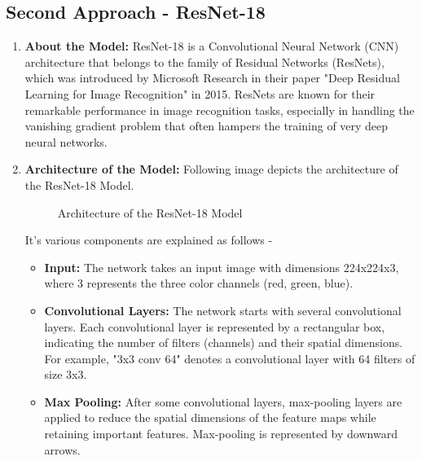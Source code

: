 \documentclass{article}
\begin{document}
\subsection{Second Approach - ResNet-18}
\begin{enumerate}
    \item \textbf{About the Model: }ResNet-18 is a Convolutional Neural Network (CNN) architecture that belongs to the family of Residual Networks (ResNets), which was introduced by Microsoft Research in their paper "Deep Residual Learning for Image Recognition" in 2015. ResNets are known for their remarkable performance in image recognition tasks, especially in handling the vanishing gradient problem that often hampers the training of very deep neural networks.

    \item \textbf{Architecture of the Model:} Following image depicts the architecture of the ResNet-18 Model.

    \begin{figure}[!hbt]
        \noindent{}
        \caption{Architecture of the ResNet-18 Model}
    \end{figure}
    
    It's various components are explained as follows - 
    \begin{itemize}
        \item \textbf{Input:} The network takes an input image with dimensions 224x224x3, where 3 represents the three color channels (red, green, blue).

        \item \textbf{Convolutional Layers:} The network starts with several convolutional layers. Each convolutional layer is represented by a rectangular box, indicating the number of filters (channels) and their spatial dimensions. For example, "3x3 conv 64" denotes a convolutional layer with 64 filters of size 3x3.

        \item \textbf{Max Pooling:} After some convolutional layers, max-pooling layers are applied to reduce the spatial dimensions of the feature maps while retaining important features. Max-pooling is represented by downward arrows.


\end{itemize}
\end{enumerate}
\end{document}
